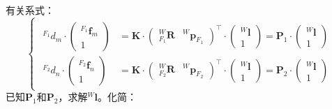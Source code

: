 \documentclass[12pt, onecolumn]{article}
\newcommand\normf{\fangsong}
\begin{document}
	\section{\normf{三角化}}
	有关系式：
	\begin{equation}
	\begin{cases}
	\begin{aligned}
	{^{F_1}d_m}\cdot\begin{pmatrix}{^{F_1}\boldsymbol{f}_m}\\1\end{pmatrix}
	&=\boldsymbol{K}\cdot\begin{pmatrix}
	{^{W}_{F_1}\boldsymbol{R}}&{^{W}\boldsymbol{p}_{F_1}}
	\end{pmatrix}^\top\cdot\begin{pmatrix}
	{^{W}\boldsymbol{l}}\\1
	\end{pmatrix}={\boldsymbol{P}_1}\cdot\begin{pmatrix}
	{^{W}\boldsymbol{l}}\\1
	\end{pmatrix}
	\\
	{^{F_2}d_n}\cdot\begin{pmatrix}{^{F_2}\boldsymbol{f}_n}\\1\end{pmatrix}
	&=\boldsymbol{K}\cdot\begin{pmatrix}
	{^{W}_{F_2}\boldsymbol{R}}&{^{W}\boldsymbol{p}_{F_2}}
	\end{pmatrix}^\top\cdot\begin{pmatrix}
	{^{W}\boldsymbol{l}}\\1
	\end{pmatrix}={\boldsymbol{P}_2}\cdot\begin{pmatrix}
	{^{W}\boldsymbol{l}}\\1
	\end{pmatrix}
	\end{aligned}
	\end{cases}
	\end{equation}
	已知${\boldsymbol{P}_1}$和${\boldsymbol{P}_2}$，求解${^{W}\boldsymbol{l}}$。化简：
\end{document}
